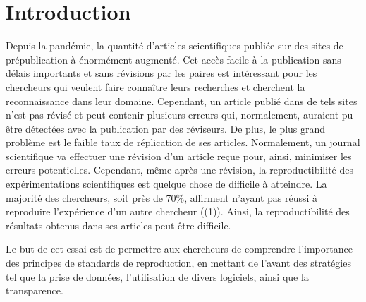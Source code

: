 \documentclass[9pt,twocolumn,twoside,]{pnas-new}
\title{}
\author[a]{Laura Béland}
\affil[a]{Université de Sherbrooke, Départment de biologie, 2500
Boulevard de l'Université, Sherbrooke, Québec, J1K 2R1}
\begin{document}
\verticaladjustment{-2pt}



\maketitle
\thispagestyle{firststyle}


\acknow{}

\hypertarget{introduction}{%
\section{Introduction}\label{introduction}}

Depuis la pandémie, la quantité d'articles scientifiques publiée sur des
sites de prépublication à énormément augmenté. Cet accès facile à la
publication sans délais importants et sans révisions par les paires est
intéressant pour les chercheurs qui veulent faire connaître leurs
recherches et cherchent la reconnaissance dans leur domaine. Cependant,
un article publié dans de tels sites n'est pas révisé et peut contenir
plusieurs erreurs qui, normalement, auraient pu être détectées avec la
publication par des réviseurs. De plus, le plus grand problème est le
faible taux de réplication de ses articles. Normalement, un journal
scientifique va effectuer une révision d'un article reçue pour, ainsi,
minimiser les erreurs potentielles. Cependant, même après une révision,
la reproductibilité des expérimentations scientifiques est quelque chose
de difficile à atteindre. La majorité des chercheurs, soit près de 70\%,
affirment n'ayant pas réussi à reproduire l'expérience d'un autre
chercheur ((1)). Ainsi, la reproductibilité des résultats obtenus dans
ses articles peut être difficile.

Le but de cet essai est de permettre aux chercheurs de comprendre
l'importance des principes de standards de reproduction, en mettant de
l'avant des stratégies tel que la prise de données, l'utilisation de
divers logiciels, ainsi que la transparence.
\end{document}
